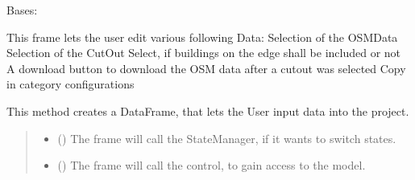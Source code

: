 \documentclass[letterpaper,10pt,english]{sphinxmanual}
\begin{document}
\begin{fulllineitems}
\label{\detokenize{apidoc/src.osm_configurator.view.toplevelframes:src.osm_configurator.view.toplevelframes.data_frame.DataFrame}}
\pysigstartsignatures
{}
\pysigstopsignatures
\sphinxAtStartPar
Bases: {\hyperref[\detokenize{apidoc/src.osm_configurator.view.toplevelframes:src.osm_configurator.view.toplevelframes.top_level_frame.TopLevelFrame}]{}}

\sphinxAtStartPar
This frame lets the user edit various following Data:
\sphinxhyphen{} Selection of the OSM\sphinxhyphen{}Data
\sphinxhyphen{} Selection of the Cut\sphinxhyphen{}Out
\sphinxhyphen{} Select, if buildings on the edge shall be included or not
\sphinxhyphen{} A download button to download the OSM data after a cut\sphinxhyphen{}out was selected
\sphinxhyphen{} Copy in category configurations

\begin{fulllineitems}
\label{\detokenize{apidoc/src.osm_configurator.view.toplevelframes:src.osm_configurator.view.toplevelframes.data_frame.DataFrame.__init__}}
\pysigstartsignatures
{}
\pysigstopsignatures
\sphinxAtStartPar
This method creates a DataFrame, that lets the User input data into the project.
\begin{quote}\begin{description}
\begin{itemize}
\item {} 
\sphinxAtStartPar
{} ({\hyperref[\detokenize{apidoc/src.osm_configurator.view.states:src.osm_configurator.view.states.state_manager.StateManager}]{}}) \textendash{} The frame will call the StateManager, if it wants to switch states.

\item {} 
\sphinxAtStartPar
{} ({\hyperref[\detokenize{apidoc/src.osm_configurator.control:src.osm_configurator.control.control_interface.IControl}]{}}) \textendash{} The frame will call the control, to gain access to the model.


\end{itemize}
\end{description}
\end{quote}
\end{fulllineitems}
\end{fulllineitems}
\end{document}

